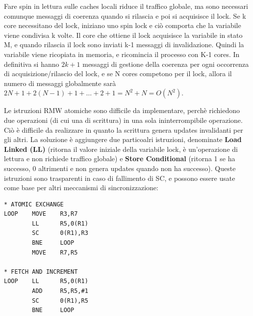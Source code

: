 \begin{figure}[ht]
    \centering
    \setlength{\fboxrule}{0.5pt} %
    \setlength{\fboxsep}{0pt}    %
\end{figure}

\noindent Fare spin in lettura sulle caches locali riduce il traffico globale, ma sono necessari comunque messaggi di coerenza quando si rilascia e poi si acquisisce il lock. Se k core necessitano del lock, iniziano uno spin lock e ciò comporta che la variabile viene condivisa k volte. Il core che ottiene il lock acquisisce la variabile in stato M, e quando rilascia il lock sono inviati k-1 messaggi di invalidazione. Quindi la variabile viene ricopiata in memoria, e ricomincia il processo con K-1 cores. 
In definitiva si hanno $2k+1$ messaggi di gestione della coerenza per ogni occorrenza di acquisizione/rilascio del lock, e se N cores competono per il lock, allora il numero di messaggi globalmente sarà $2N+1 + 2(N-1)+1 + \dots + 2+1 = N^2 + N = O(N^2)$.

\noindent Le istruzioni RMW atomiche sono difficile da implementare, perchè richiedono due operazioni (di cui una di scrittura) in una sola ininterrompibile operazione. Ciò è difficile da realizzare in quanto la scrittura genera updates invalidanti per gli altri. La soluzione è aggiungere due particoalri istruzioni, denominate \textbf{Load Linked (LL)} (ritorna il valore iniziale della variabile lock, è un'operazione di lettura e non richiede traffico globale) e \textbf{Store Conditional} (ritorna 1 se ha successo, 0 altrimenti e non genera updates quando non ha successo). Queste istruzioni sono trasparenti in caso di fallimento di SC, e possono essere usate come base per altri meccanismi di sincronizzazione:

\begin{lstlisting}[language={RISCAsm}]
* ATOMIC EXCHANGE 
LOOP    MOVE    R3,R7 
        LL      R5,0(R1)
        SC      0(R1),R3 
        BNE     LOOP
        MOVE    R7,R5 

* FETCH AND INCREMENT 
LOOP    LL      R5,0(R1)
        ADD     R5,R5,#1
        SC      0(R1),R5 
        BNE     LOOP 
\end{lstlisting}
